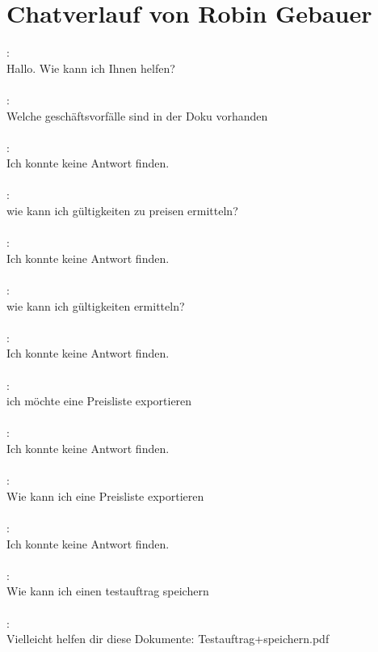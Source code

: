 \newpage
\section{Chatverlauf von Robin Gebauer}
\label{ch:chatverlaeufe:robin}
\speaker{\Chatbot}: \\
Hallo. Wie kann ich Ihnen helfen? \\\\
\speaker{\RobinGebauer}: \\
Welche geschäftsvorfälle sind in der Doku vorhanden \\\\
\speaker{\Chatbot}: \\
Ich konnte keine Antwort finden. \\\\
\speaker{\RobinGebauer}: \\
wie kann ich gültigkeiten zu preisen ermitteln? \\\\
\speaker{\Chatbot}: \\
Ich konnte keine Antwort finden. \\\\
\speaker{\RobinGebauer}: \\
wie kann ich gültigkeiten ermitteln? \\\\
\speaker{\Chatbot}: \\
Ich konnte keine Antwort finden. \\\\
\speaker{\RobinGebauer}: \\
ich möchte eine Preisliste exportieren \\\\
\speaker{\Chatbot}: \\
Ich konnte keine Antwort finden. \\\\
\speaker{\RobinGebauer}: \\
Wie kann ich eine Preisliste exportieren \\\\
\speaker{\Chatbot}: \\
Ich konnte keine Antwort finden. \\\\
\speaker{\RobinGebauer}: \\
Wie kann ich einen testauftrag speichern \\\\
\speaker{\Chatbot}: \\
Vielleicht helfen dir diese Dokumente: Testauftrag+speichern.pdf \\\\
